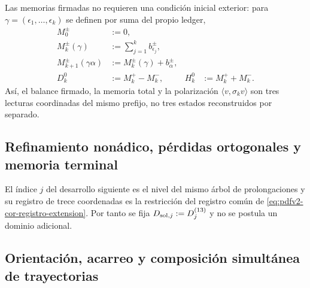 Las memorias firmadas no requieren una condición inicial exterior: para
\(\gamma=(\epsilon_1,\ldots,\epsilon_k)\) se definen por suma del propio
ledger,
\begin{equation}
\label{eq:pdfv2-cor-memorias}
 \begin{aligned}
 M_0^\pm&:=0,\\
 M_k^\pm(\gamma)&:=\sum_{j=1}^k b_{\epsilon_j}^\pm,\\
 M_{k+1}^\pm(\gamma\alpha)&:=M_k^\pm(\gamma)+b_\alpha^\pm,\\
 D_k^0&:=M_k^+-M_k^-, &
 H_k^0&:=M_k^++M_k^-.
 \end{aligned}
\end{equation}
Así, el balance firmado, la memoria total y la polarización
\(\langle v,\sigma_kv\rangle\) son tres lecturas coordinadas del mismo
prefijo, no tres estados reconstruidos por separado.

\subsection{Refinamiento nonádico, pérdidas ortogonales y memoria terminal}
El índice \(j\) del desarrollo siguiente es el nivel del mismo árbol de
prolongaciones y su registro de trece coordenadas es la restricción del
registro común de \eqref{eq:pdfv2-cor-registro-extension}. Por tanto se fija
\(D_{{\rm sol},j}:=D_j^{(13)}\) y no se postula un dominio adicional.
\begingroup
  \let\section\subsection
  
\endgroup

\section{Orientación, acarreo y composición simultánea de trayectorias}

